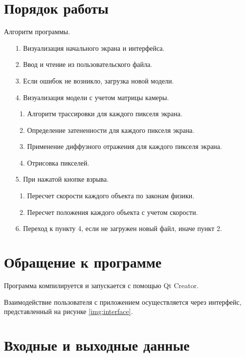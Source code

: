 \section{\textbf{Порядок работы }}

Алгоритм программы. 

\begin{enumerate}
	\item[1. ] Визуализация начального экрана и интерфейса. 
	\item[2. ] Ввод и чтение из пользовательского файла. 
	\item[3. ] Если ошибок не возникло, загрузка новой модели. 
	\item[4. ] Визуализация модели с учетом матрицы камеры. 
	\begin{enumerate}
		\item Алгоритм трассировки для каждого пикселя экрана. 
		\item Определение затененности для каждого пикселя экрана. 
		\item Применение диффузного отражения для каждого пикселя экрана. 
		\item Отрисовка пикселей. 
	\end{enumerate}
	\item[5. ] При нажатой кнопке взрыва. 
	\begin{enumerate}
		\item Пересчет скорости каждого объекта по законам физики. 
		\item Пересчет положения каждого объекта с учетом скорости. 
	\end{enumerate}
	\item[6. ] Переход к пункту 4, если не загружен новый файл, иначе пункт 2. 
\end{enumerate}

\section{\textbf{Обращение к программе }}

Программа компилируется и запускается с помощью Qt Creator. 

Взаимодействие пользователя с приложением осуществляется через интерфейс, представленный на рисунке \ref{img:interface}. 

\section{\textbf{Входные и выходные данные }}


